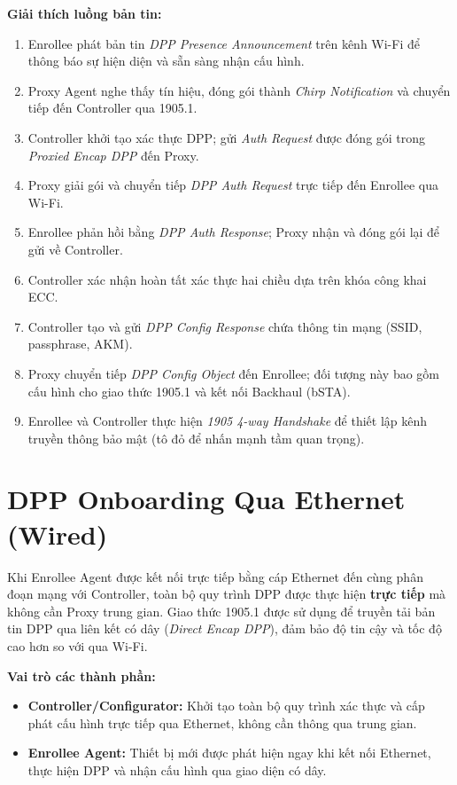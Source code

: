 \textbf{Giải thích luồng bản tin:}
\begin{enumerate}
	\item Enrollee phát bản tin \textit{DPP Presence Announcement} trên kênh Wi-Fi để
	thông báo sự hiện diện và sẵn sàng nhận cấu hình.
	\item Proxy Agent nghe thấy tín hiệu, đóng gói thành \textit{Chirp Notification} và
	chuyển tiếp đến Controller qua 1905.1.
	\item Controller khởi tạo xác thực DPP; gửi \textit{Auth Request} được đóng gói
	trong \textit{Proxied Encap DPP} đến Proxy.
	\item Proxy giải gói và chuyển tiếp \textit{DPP Auth Request} trực tiếp đến Enrollee
	qua Wi-Fi.
	\item Enrollee phản hồi bằng \textit{DPP Auth Response}; Proxy nhận và đóng gói lại
	để gửi về Controller.
	\item Controller xác nhận hoàn tất xác thực hai chiều dựa trên khóa công khai ECC.
	\item Controller tạo và gửi \textit{DPP Config Response} chứa thông tin mạng (SSID,
	passphrase, AKM).
	\item Proxy chuyển tiếp \textit{DPP Config Object} đến Enrollee; đối tượng này bao
	gồm cấu hình cho giao thức 1905.1 và kết nối Backhaul (bSTA).
	\item Enrollee và Controller thực hiện \textit{1905 4-way Handshake} để thiết lập
	kênh truyền thông bảo mật (tô đỏ để nhấn mạnh tầm quan trọng).
\end{enumerate}


\section{DPP Onboarding Qua Ethernet (Wired)}

Khi Enrollee Agent được kết nối trực tiếp bằng cáp Ethernet đến cùng phân đoạn mạng với
Controller, toàn bộ quy trình DPP được thực hiện \textbf{trực tiếp} mà không cần Proxy
trung gian. Giao thức 1905.1 được sử dụng để truyền tải bản tin DPP qua liên kết có dây
(\textit{Direct Encap DPP}), đảm bảo độ tin cậy và tốc độ cao hơn so với qua Wi-Fi.

\textbf{Vai trò các thành phần:}
\begin{itemize}
	\item \textbf{Controller/Configurator:} Khởi tạo toàn bộ quy trình xác thực và cấp
	phát cấu hình trực tiếp qua Ethernet, không cần thông qua trung gian.
	\item \textbf{Enrollee Agent:} Thiết bị mới được phát hiện ngay khi kết nối Ethernet,
	thực hiện DPP và nhận cấu hình qua giao diện có dây.
\end{itemize}

